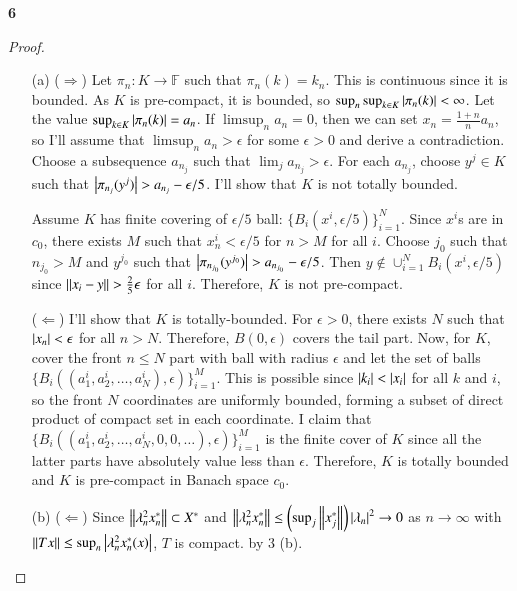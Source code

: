 \documentclass[a4paper, 12pt]{article}
\theoremstyle{Mydefinition}
\theoremstyle{Mytheorem}
\begin{document}
\noindent \textbf{6}

\begin{proof}
    \begin{enumerate}
        \item[(a)]($\Rightarrow$) Let $\pi_n:K\rightarrow \mathbb{F}$ such that $\pi_n(k) = k_n$. This is continuous since it is bounded. As $K$ is pre-compact, it is bounded, so $\sup_{n}\sup_{k\in K}\abs{\pi_n(k)}<\infty$. Let the value $\sup_{k\in K}\abs{\pi_n(k)} = a_n$. If $\limsup_{n} a_n = 0$, then we can set $x_n = \frac{1+n}{n}a_n$, so I'll assume that $\limsup_n a_n>\epsilon$ for some $\epsilon>0$ and derive a contradiction. Choose a subsequence $a_{n_j}$ such that $\lim_{j} a_{n_j} > \epsilon$. For each $a_{n_j}$, choose $y^j \in K$ such that $\abs{\pi_{n_j}(y^j)}>a_{n_j}-\epsilon/5$. I'll show that $K$ is not totally bounded. 
        
        Assume $K$ has finite covering of $\epsilon/5$ ball: $\{B_i(x^i, \epsilon/5)\}_{i=1}^N$. Since $x^i$s are in $c_0$, there exists $M$ such that $x^i_n<\epsilon/5$ for $n>M$ for all $i$. Choose $j_0$ such that $n_{j_0}>M$ and $y^{j_0}$ such that $\abs{\pi_{n_{j_0}}(y^{j_0})}>a_{n_{j_0}}-\epsilon/5$. Then $y\notin \cup_{i=1}^N B_i(x^i, \epsilon/5)$ since $\norm{x_i-y}>\frac{2}{5}\epsilon$ for all $i$. Therefore, $K$ is not pre-compact.
        
        ($\Leftarrow$) I'll show that $K$ is totally-bounded. For $\epsilon>0$, there exists $N$ such that $\abs{x_n}<\epsilon$ for all $n>N$. Therefore, $B(0, \epsilon)$ covers the tail part. Now, for $K$, cover the front $n\leq N$ part with ball with radius $\epsilon$ and let the set of balls $\{B_i((a^i_1, a^i_2, \ldots, a^i_N), \epsilon)\}_{i=1}^M$. This is possible since $\abs{k_i}<\abs{x_i}$ for all $k$ and $i$, so the front $N$ coordinates are uniformly bounded, forming a subset of direct product of compact set in each coordinate. I claim that $\{B_i((a^i_1, a^i_2, \ldots, a^i_N, 0, 0,\ldots), \epsilon)\}_{i=1}^M$ is the finite cover of $K$ since all the latter parts have absolutely value less than $\epsilon$. Therefore, $K$ is totally bounded and $K$ is pre-compact in Banach space $c_0$.
        
        \item[(b)] ($\Leftarrow$) Since $\norm{\lambda_n^2 x_n^*}\subset X^*$ and $\norm{\lambda_n^2 x_n^*}\leq \left(\sup_{j}\norm{x_j^*}\right)\abs{\lambda_n}^2\rightarrow 0$ as $n\rightarrow \infty$ with $\norm{Tx}\leq \sup_n\abs{\lambda_n^2 x_n^*(x)}$, $T$ is compact. by 3 (b).
        

\end{enumerate}
\end{proof}
\end{document}
